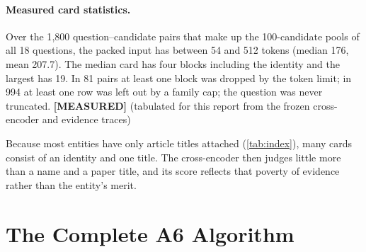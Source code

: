 \documentclass[11pt,a4paper]{article}
\newcommand{\cref}[1]{\autoref{#1}}
\theoremstyle{remark}
\newcommand{\vtag}[2]{{\sffamily\scriptsize\bfseries\textcolor{#1}{[#2]}}}
\newcommand{\Mtag}{\vtag{measgreen}{MEASURED}}
\begin{document}
\paragraph{Measured card statistics.} Over the 1{,}800 question--candidate pairs that make
up the 100-candidate pools of all 18 questions, the packed input has between 54 and 512
tokens (median 176, mean 207.7). The median card has four blocks including the identity
and the largest has 19. In 81 pairs at least one block was dropped by the token limit; in
994 at least one row was left out by a family cap; the question was never truncated.
\Mtag{} (tabulated for this report from the frozen cross-encoder and evidence traces)

\begin{cautionbox}
Because most entities have only article titles attached (\cref{tab:index}), many cards
consist of an identity and one title. The cross-encoder then judges little more than a
name and a paper title, and its score reflects that poverty of evidence rather than the
entity's merit.
\end{cautionbox}

\section{The Complete A6 Algorithm}
\label{sec:algorithm}
\end{document}
